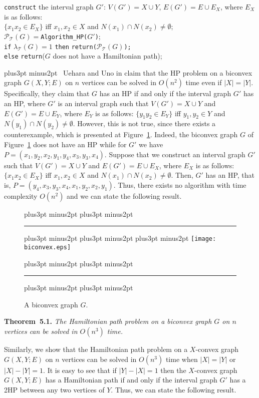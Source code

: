 \documentclass[10pt]{article}
\def\yskip{\penalty-50\vskip3pt plus3pt minus2pt}
\def\y{\yskip}
\def\yy{\yskip\yskip}
\def\s{\ }
\begin{document}
{\begin{enumerate}
         \phantom{if} {\tt construct} the interval graph $G'$: $V(G')=X \cup Y$, $E(G')=E \cup E_X$,
         where $E_X$ is as follows: \\
         \phantom{if} \phantom{if} $\{x_1x_2 \in E_X\}$ iff $x_1,x_2 \in X$ and $N(x_1) \cap N(x_2) \neq \emptyset$;\\
         \phantom{if} $\mathcal{P}_\mathcal{T}(G)=${\tt Algorithm\_HP($G'$)};\\
         \phantom{if} {\tt if} $\lambda_\mathcal{T}(G)=1$ {\tt then} {\tt return($\mathcal{P}_\mathcal{T}(G)$);}\\
         \phantom{if} {\tt else} {\tt return}($G$ does not have a Hamiltonian path);
\end{enumerate}


\y {} \s Uehara and Uno in
\cite{UeharaUno} claim that the HP problem on a biconvex graph
$G(X,Y;E)$ on $n$ vertices can be solved in $O(n^2)$ time even if
$|X|=|Y|$. Specifically, they claim that $G$ has an HP if and only
if the interval graph $G'$ has an HP, where $G'$ is an interval
graph such that $V(G')=X \cup Y$ and $E(G')=E \cup E_Y$, where
$E_Y$ is as follows: $\{y_1y_2 \in E_Y\}$ iff $y_1,y_2 \in Y$ and
$N(y_1) \cap N(y_2) \neq \emptyset$. However, this is not true,
since there exists a counterexample, which is presented at
Figure~\ref{biconvex}. Indeed, the biconvex graph $G$ of
Figure~\ref{biconvex} does not have an HP while for $G'$ we have
$P=(x_1, y_2, x_2, y_1, y_4, x_3, y_3, x_4)$. Suppose that we
construct an interval graph $G'$ such that $V(G')=X \cup Y$ and
$E(G')=E \cup E_X$, where $E_X$ is as follows: $\{x_1x_2 \in
E_X\}$ iff $x_1,x_2 \in X$ and $N(x_1) \cap N(x_2) \neq
\emptyset$. Then, $G'$ has an HP, that is, $P=(y_4, x_3, y_3, x_4,
x_1, y_2, x_2, y_1)$. Thus, there exists no algorithm with time
complexity $O(n^2)$ and we can state the following result.


\begin{figure}[t]
\yy \hrule \y\y\y
  \centering
  \texttt{[image: biconvex.eps]}
  \centering
  \caption{\small{A biconvex graph $G$.}}
  \label{biconvex}
 \yy \hrule \y\y
\end{figure}

\bigskip
\par\noindent
{\bf Theorem~5.1.} {\it The Hamiltonian path problem on a biconvex
graph $G$ on $n$ vertices can be solved in $O(n^3)$ time.}

\bigskip Similarly, we show that the Hamiltonian path problem on a
$X$-convex graph $G(X,Y;E)$ on $n$ vertices can be solved in
$O(n^3)$ time when $|X|=|Y|$ or $|X|-|Y|=1$. It is easy to see
that if $|Y|-|X|=1$ then the $X$-convex graph $G(X,Y;E)$ has a
Hamiltonian path if and only if the interval graph $G'$ has a 2HP
between any two vertices of $Y$. Thus, we can state the following
result.

}
\end{document}
